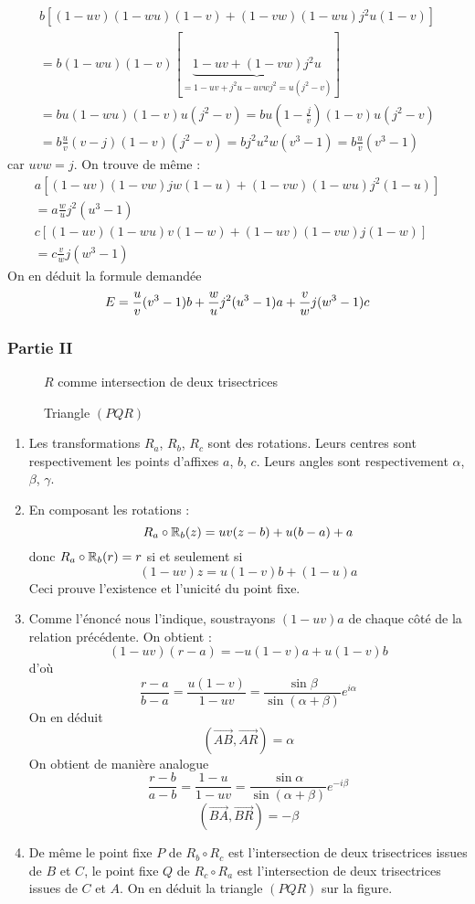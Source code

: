 \begin{enumerate}
\begin{multline*}
b\left[(1-uv)(1-wu)(1-v)+(1-vw)(1-wu)j^2u(1-v)\right] \\
=
b(1-wu)(1-v)\left[ \underbrace{1-uv+(1-vw)j^2u}_{=1-uv+j^2u-uvwj^2=u(j^2-v)} \right] \\
 =
bu(1-wu)(1-v)u(j^2-v)
 =
bu(1-\frac{j}{v})(1-v)u(j^2-v)\\
 =
b\frac{u}{v}(v-j)(1-v)(j^2-v)
 =
bj^2u^2w(v^3-1)
 =
b\frac{u}{v}(v^3-1)
\end{multline*}
car $uvw=j$. On trouve de même :
\begin{align*}
a\left[(1-uv)(1-vw)jw(1-u)+(1-vw)(1-wu)j^2(1-u) \right] \\
=  a\frac{w}{u}j^2(u^3-1) \\
c\left[(1-uv)(1-wu)v(1-w)+(1-uv)(1-vw)j(1-w) \right] \\
= c\frac{v}{w}j(w^3-1)
\end{align*}
On en déduit la formule demandée
\[
E = \frac{u}{v}(v^3-1)b + \frac{w}{u}j^2(u^3-1)a + \frac{v}{w}j(w^3-1)c \\ 
\]
\end{enumerate}

\subsubsection*{Partie II}
\begin{figure}[ht]
	\centering
	
	\caption{$R$ comme intersection de deux trisectrices}
        \label{fig:Ctrisec_1}
\end{figure}
\begin{figure}[ht]
	\centering
	
	\caption{Triangle $(PQR)$}
        \label{fig:Ctrisec_2}
\end{figure}

\begin{enumerate}
	\item Les transformations $R_a$, $R_b$, $R_c$ sont des rotations. Leurs centres sont respectivement les points d'affixes $a$, $b$, $c$. Leurs angles sont respectivement $\alpha$, $\beta$, $\gamma$.
	\item En composant les rotations :
\[R_a \circ \mathbb{R}_b(z)=uv(z-b)+u(b-a)+a \]
donc $R_a \circ \mathbb{R}_b(r)=r$ si et seulement si
\[(1-uv)z=u(1-v)b+(1-u)a\]
Ceci prouve l'existence et l'unicité du point fixe.
\item Comme l'énoncé nous l'indique, soustrayons $(1-uv)a$ de chaque côté de la relation précédente. On obtient :
\[(1-uv)(r-a)=-u(1-v)a+u(1-v)b\]
d'où
\[\frac{r-a}{b-a}=\frac{u(1-v)}{1-uv}=\frac{\sin \beta}{\sin (\alpha + \beta)}e^{i\alpha}\]
On en déduit
\[(\overrightarrow{AB},\overrightarrow{AR})=\alpha\]
On obtient de manière analogue
\[\frac{r-b}{a-b}=\frac{1-u}{1-uv}=\frac{\sin \alpha}{\sin (\alpha + \beta)}e^{-i\beta}\] \[(\overrightarrow{BA},\overrightarrow{BR})=-\beta\]
\item De même le point fixe $P$ de $R_b \circ R_c$ est l'intersection de deux trisectrices issues de $B$ et $C$, le point fixe $Q$ de $R_c \circ R_a$ est l'intersection de deux trisectrices issues de $C$ et $A$. On en déduit la triangle $(PQR)$ sur la figure.
\end{enumerate}

